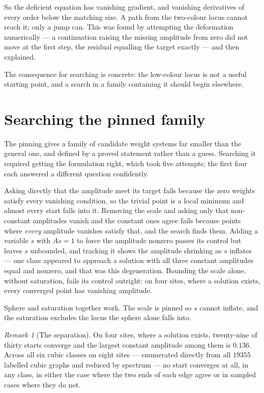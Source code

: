 \documentclass[11pt]{article}
\theoremstyle{definition}
\theoremstyle{remark}
\newtheorem{remark}[theorem]{Remark}
\begin{document}
So the deficient equation has vanishing gradient, and vanishing derivatives of every
order below the matching size. A path from the two-colour locus cannot reach it; only a
jump can. This was found by attempting the deformation numerically --- a continuation
raising the missing amplitude from zero did not move at the first step, the residual
equalling the target exactly --- and then explained.

The consequence for searching is concrete: the low-colour locus is not a useful starting
point, and a search in a family containing it should begin elsewhere.

\section{Searching the pinned family}\label{sec:pinnedsearch}

The pinning gives a family of candidate weight systems far smaller than the general one,
and defined by a proved statement rather than a guess. Searching it required getting the
formulation right, which took five attempts; the first four each answered a different
question confidently.

Asking directly that the amplitude meet its target fails because the zero weights satisfy
every vanishing condition, so the trivial point is a local minimum and almost every start
falls into it. Removing the scale and asking only that non-constant amplitudes vanish and
the constant ones agree fails because points where \emph{every} amplitude vanishes satisfy
that, and the search finds them. Adding a variable $s$ with $A s = 1$ to force the
amplitude nonzero passes its control but leaves $s$ unbounded, and tracking it shows the
amplitude shrinking as $s$ inflates --- one class appeared to approach a solution with all
three constant amplitudes equal and nonzero, and that was this degeneration. Bounding the
scale alone, without saturation, fails its control outright: on four sites, where a
solution exists, every converged point has vanishing amplitude.

Sphere and saturation together work. The scale is pinned so $s$ cannot inflate, and the
saturation excludes the locus the sphere alone falls into.

\begin{remark}[The separation]
On four sites, where a solution exists, twenty-nine of thirty starts converge and the
largest constant amplitude among them is $0.136$. Across all six cubic classes on eight
sites --- enumerated directly from all $19355$ labelled cubic graphs and reduced by
spectrum --- no start converges at all, in any class, in either the case where the two ends
of each edge agree or in sampled cases where they do not.
\end{remark}
\end{document}
